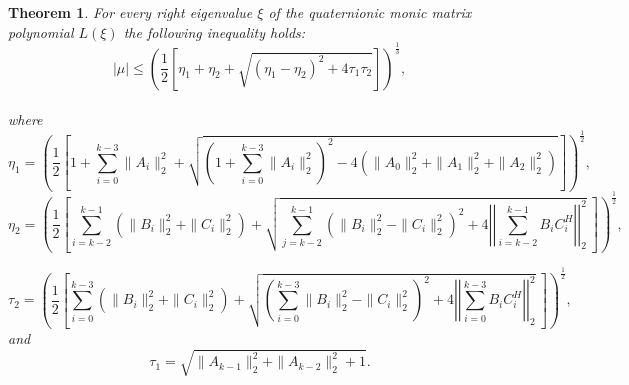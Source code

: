\documentclass [12pt]{article}
\newtheorem{theorem}{Theorem}
[section]
\begin{document}
\begin{theorem}{\label{theorem 3.7}}
   For every right eigenvalue $\xi$ of the quaternionic monic matrix polynomial $L(\xi)$ the following inequality holds:\\
    \begin{equation*}
|\mu| \le \left( \frac{1}{2} \left[ \eta _{1} + \eta_{2} +\sqrt{(\eta_{1}-\eta_{2})^{2}+4\tau_{1}\tau_{2} } \right] \right)^{\frac{1}{3}},
\end{equation*}\\
where 
\begin{equation*}
    \eta_{1}=\left( \frac{1}{2} \left[ 1+ \sum_{i=0}^{k-3}\|A_{i}\|^{2}_{2} 
    +\sqrt{\left( 1+ \sum_{i=0}^{k-3}\|A_{i}\|^{2}_{2}\right)^{2} -4\left(\|A_{0}\|^{2}_{2} +\|A_{1}\|^{2}_{2}+\|A_{2}\|^{2}_{2}\right) }\right] \right)^\frac{1}{2},
\end{equation*}
\begin{equation*}
    \eta_{2}=\left( \frac{1}{2} \left[   \sum_{i=k-2}^{k-1} \left(\|B_{i}\|^{2}_{2}+\|C_{i}\|^{2}_{2} \right)    +\sqrt{\sum_{j=k-2}^{k-1} \left(\|B_{i}\|^{2}_{2}-\|C_{i}\|^{2}_{2} \right)^{2}+4\left|\left|\sum_{i=k-2}^{k-1}B_{i}{C_{i}^
    {H}} \right|\right|_{2}^{2}}~                   \right] \right)^{\frac{1}{2}},  
\end{equation*}


\begin{equation*}
\tau_{2}=\left( \frac{1}{2} \left[   \sum_{i=0}^{k-3} \left(\|B_{i}\|^{2}_{2}+\|C_{i}\|^{2}_{2} \right)    +\sqrt{ \left(\sum_{i=0}^{k-3}\|B_{i}\|^{2}_{2}-\|C_{i}\|^{2}_{2} \right)^{2}+4\left|\left|\sum_{i=0}^{k-3}B_{i}{C_{i}^{H}} \right|\right|_{2}^{2}}~                   \right] \right)^{\frac{1}{2}}, 
\end{equation*}
 and 
 \begin{equation*}
    \tau_{1}=\sqrt{\|A_{k-1}\|^{2}_{2}+\|A_{k-2}\|^{2}_{2}+1}.
\end{equation*}
\end{theorem}
\end{document}
